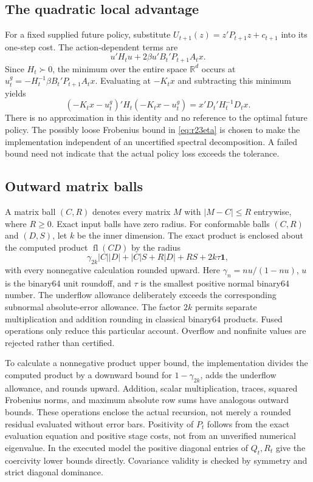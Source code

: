 \documentclass[ecta,nameyear,draft]{econsocart}
\theoremstyle{definition}
\theoremstyle{remark}
\newcommand{\R}{\mathbb R}
\begin{document}
\subsection{The quadratic local advantage}
For a fixed supplied future policy, substitute
$U_{t+1}(z)=z'P_{t+1}z+c_{t+1}$ into its one-step cost. The action-dependent
terms are
\[
 u'H_tu+2\beta u'B_t'P_{t+1}A_tx.
\]
Since $H_t\succ0$, the minimum over the entire space $\R^d$ occurs at
$u_t^g=-H_t^{-1}\beta B_t'P_{t+1}A_tx$. Evaluating at $-K_tx$ and subtracting
this minimum yields
\[
 (-K_tx-u_t^g)'H_t(-K_tx-u_t^g)=x'D_t'H_t^{-1}D_tx.
\]
There is no approximation in this identity and no reference to the optimal
future policy. The possibly loose Frobenius bound in
\eqref{eq:r23eta} is chosen to make the implementation independent of an
uncertified spectral decomposition. A failed bound need not indicate that
the actual policy loss exceeds the tolerance.

\subsection{Outward matrix balls}
A matrix ball $(C,R)$ denotes every matrix $M$ with
$|M-C|\leq R$ entrywise, where $R\geq0$. Exact input balls have zero radius.
For conformable balls $(C,R)$ and $(D,S)$, let $k$ be the inner dimension.
The exact product is enclosed about the computed product $\operatorname{fl}(CD)$
by the radius
\begin{equation}
 \gamma_{2k}|C||D|+|C|S+R|D|+RS+2k\tau\mathbf1,
 \label{eq:r23ballproduct}
\end{equation}
with every nonnegative calculation rounded upward. Here
$\gamma_n=nu/(1-nu)$, $u$ is the binary64 unit roundoff, and $\tau$ is the
smallest positive normal binary64 number. The underflow allowance deliberately
exceeds the corresponding subnormal absolute-error allowance. The factor
$2k$ permits separate multiplication and addition rounding in classical
binary64 products. Fused operations only reduce this particular account.
Overflow and nonfinite values are rejected rather than certified.

To calculate a nonnegative product upper bound, the implementation divides
the computed product by a downward bound for $1-\gamma_{2k}$, adds the
underflow allowance, and rounds upward. Addition, scalar multiplication,
traces, squared Frobenius norms, and maximum absolute row sums have analogous
outward bounds. These operations enclose the actual recursion, not merely
a rounded residual evaluated without error bars. Positivity of $P_t$ follows
from the exact evaluation equation and positive stage costs, not from an
unverified numerical eigenvalue. In the executed model the positive diagonal
entries of $Q_t,R_t$ give the coercivity lower bounds directly. Covariance
validity is checked by symmetry and strict diagonal dominance.
\end{document}
